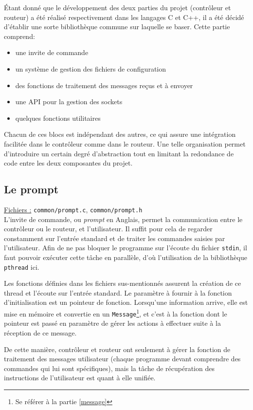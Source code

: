 \documentclass[a4paper,11pt]{article}
\begin{document}
Étant donné que le développement des deux parties du projet (contrôleur et routeur) a été réalisé respectivement dans les langages C et C++, il a été décidé d'établir une sorte bibliothèque commune sur laquelle se baser. Cette partie comprend:
\begin{itemize}
 \item une invite de commande
 \item un système de gestion des fichiers de configuration
 \item des fonctions de traitement des messages reçus et à envoyer
 \item une API pour la gestion des sockets
 \item quelques fonctions utilitaires
\end{itemize}

Chacun de ces blocs est indépendant des autres, ce qui assure une intégration facilitée dans le contrôleur comme dans le routeur. Une telle organisation permet d'introduire un certain degré d'abstraction tout en limitant la redondance 
de code entre les deux composantes du projet.

\subsection{Le prompt}

\underline{Fichiers :} \texttt{common/prompt.c}, \texttt{common/prompt.h}\\

L'invite de commande, ou \textit{prompt} en Anglais, permet la communication entre le contrôleur ou le routeur, et l'utilisateur. Il suffit pour cela de regarder constamment sur l'entrée standard et de traiter les commandes saisies par l'utilisateur. Afin de ne pas bloquer le programme sur l'écoute du fichier \texttt{stdin}, il faut pouvoir exécuter cette tâche en parallèle, d'où l'utilisation de la bibliothèque \texttt{pthread} ici.

Les fonctions définies dans les fichiers sus-mentionnés assurent la création de ce thread et l'écoute sur l'entrée standard. Le paramètre à fournir à la fonction d'initialisation est un pointeur de fonction. Lorsqu'une information arrive, elle est mise en mémoire et convertie en un \texttt{Message}\footnote{Se référer à la partie \ref{message}}, et c'est à la fonction dont le pointeur est passé en paramètre de gérer les actions à effectuer suite à la réception de ce message.

De cette manière, contrôleur et routeur ont seulement à gérer la fonction de traitement des messages utilisateur (chaque programme devant comprendre des commandes qui lui sont spécifiques), mais la tâche de récupération des instructions de l'utilisateur est quant à elle unifiée.
\end{document}

